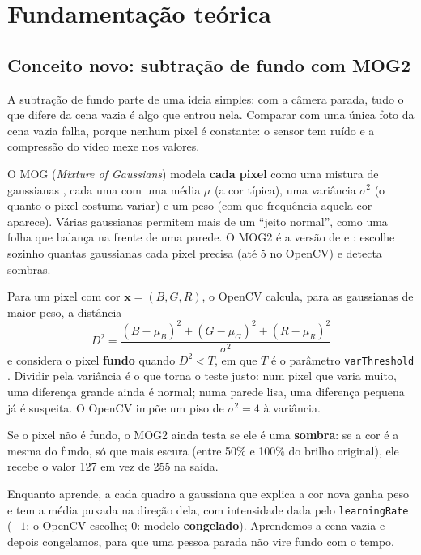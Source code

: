 \section{Fundamentação teórica}
\label{sec:fundamentacao}

\subsection{Conceito novo: subtração de fundo com MOG2}
\label{sec:mog2}

A subtração de fundo parte de uma ideia simples: com a câmera parada,
tudo o que difere da cena vazia é algo que entrou nela. Comparar com
uma única foto da cena vazia falha, porque nenhum pixel é constante: o
sensor tem ruído e a compressão do vídeo mexe nos valores.

O MOG (\textit{Mixture of Gaussians}) modela \textbf{cada pixel} como
uma mistura de gaussianas \citep{stauffer1999}, cada uma com uma média
$\mu$ (a cor típica), uma variância $\sigma^2$ (o quanto o pixel
costuma variar) e um peso (com que frequência aquela cor aparece).
Várias gaussianas permitem mais de um ``jeito normal'', como uma folha
que balança na frente de uma parede. O MOG2 é a versão de
\citet{zivkovic2004} e \citet{zivkovic2006}: escolhe sozinho quantas
gaussianas cada pixel precisa (até 5 no OpenCV) e detecta sombras.

Para um pixel com cor $\mathbf{x} = (B, G, R)$, o OpenCV calcula, para
as gaussianas de maior peso, a distância
\begin{equation}
D^2 = \frac{(B-\mu_B)^2 + (G-\mu_G)^2 + (R-\mu_R)^2}{\sigma^2}
\label{eq:mog2}
\end{equation}
e considera o pixel \textbf{fundo} quando $D^2 < T$, em que $T$ é o
parâmetro \texttt{varThreshold} \citep{opencv_mog2}. Dividir pela
variância é o que torna o teste justo: num pixel que varia muito, uma
diferença grande ainda é normal; numa parede lisa, uma diferença pequena
já é suspeita. O OpenCV impõe um piso de $\sigma^2 = 4$ à variância.

Se o pixel não é fundo, o MOG2 ainda testa se ele é uma
\textbf{sombra}: se a cor é a mesma do fundo, só que mais escura (entre
50\% e 100\% do brilho original), ele recebe o valor 127 em vez de 255
na saída.

Enquanto aprende, a cada quadro a gaussiana que explica a cor nova
ganha peso e tem a média puxada na direção dela, com intensidade dada
pelo \texttt{learningRate} ($-1$: o OpenCV escolhe; $0$: modelo
\textbf{congelado}). Aprendemos a cena vazia e depois congelamos, para
que uma pessoa parada não vire fundo com o tempo.

